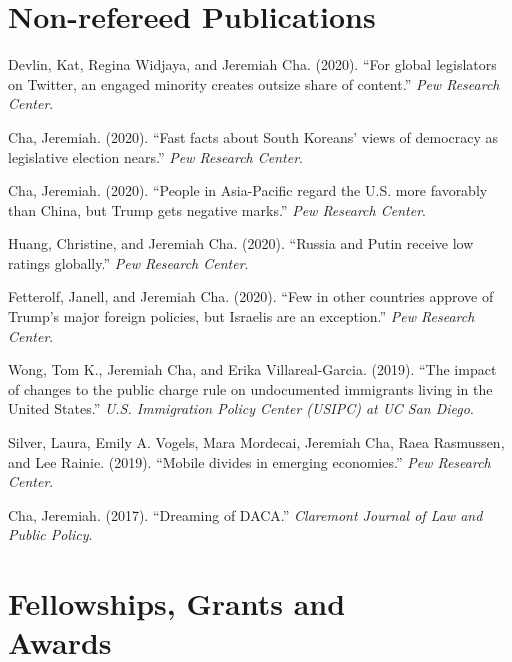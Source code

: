 \documentclass[margin, line]{res}
\begin{document}
\begin{resume}
\section{Non-refereed Publications}
\begin{etaremune}
	\item Devlin, Kat, Regina Widjaya, and Jeremiah Cha. (2020). ``For global legislators on Twitter, an engaged minority creates outsize share of content.'' \emph{Pew Research Center}.
    \item Cha, Jeremiah. (2020). ``Fast facts about South Koreans’ views of democracy as legislative election nears.'' \emph{Pew Research Center}.
    \item Cha, Jeremiah. (2020). ``People in Asia-Pacific regard the U.S. more favorably than China, but Trump gets negative marks.'' \emph{Pew Research Center}.
    \item Huang, Christine, and Jeremiah Cha. (2020). ``Russia and Putin receive low ratings globally.'' \emph{Pew Research Center}.
    \item Fetterolf, Janell, and Jeremiah Cha. (2020). ``Few in other countries approve of Trump’s major foreign policies, but Israelis are an exception.'' \emph{Pew Research Center}.
    \item Wong, Tom K., Jeremiah Cha, and Erika Villareal-Garcia. (2019). ``The impact of changes to the public charge rule on undocumented immigrants living in the United States.'' \emph{U.S. Immigration Policy Center (USIPC) at UC San Diego}.
    \item Silver, Laura, Emily A. Vogels, Mara Mordecai, Jeremiah Cha, Raea Rasmussen, and Lee Rainie. (2019). ``Mobile divides in emerging economies.'' \emph{Pew Research Center}.
    \item Cha, Jeremiah. (2017). ``Dreaming of DACA.'' \emph{Claremont Journal of Law and Public Policy}.
\end{etaremune}


\section{Fellowships, Grants and \\Awards}



\end{resume}
\end{document}
